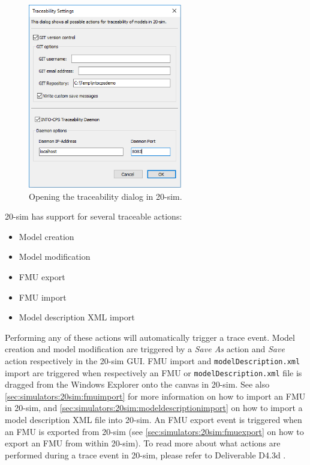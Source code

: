 \begin{figure}[ht]
	\centerline{\includegraphics[width=0.6\textwidth]{figures/20sim_TraceabilityDialog2.png}}
	\caption{Opening the traceability dialog in 20-sim.}
	\label{figure:20-sim_traceability_dialog2}
\end{figure}

20-sim has support for several traceable actions:
%
\begin{itemize}
	\item Model creation
	\item Model modification
	\item FMU export
	\item FMU import
	\item Model description XML import
\end{itemize}
%
Performing any of these actions will automatically trigger a trace event. Model creation and model modification are triggered by a \emph{Save As} action and \emph{Save} action respectively in the 20-sim GUI. FMU import and \texttt{model\-Des\-crip\-tion.xml} import are triggered when respectively an FMU or \texttt{model\-Des\-crip\-tion.xml} file is dragged from the Windows Explorer onto the canvas in 20-sim. See also \autoref{sec:simulators:20sim:fmuimport} for more information on how to import an FMU in 20-sim, and \autoref{sec:simulators:20sim:modeldescriptionimport} on how to import a model description XML file into 20-sim. An FMU export event is triggered when an FMU is exported from 20-sim (see \autoref{sec:simulators:20sim:fmuexport} on how to export an FMU from within 20-sim). To read more about what actions are performed during a trace event in 20-sim, please refer to Deliverable D4.3d \cite{INTOCPSD4.3d}.
%
%
%
